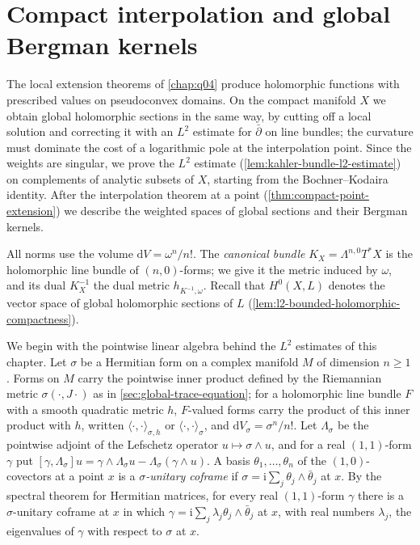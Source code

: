 \section{Compact interpolation and global Bergman kernels}
\label{sec:compact-point-bergman}
The local extension theorems of \cref{chap:q04} produce holomorphic functions with prescribed values on pseudoconvex domains. On the compact manifold $X$ we obtain global holomorphic sections in the same way, by cutting off a local solution and correcting it with an $L^2$ estimate for $\bar\partial$ on line bundles; the curvature must dominate the cost of a logarithmic pole at the interpolation point. Since the weights are singular, we prove the $L^2$ estimate (\cref{lem:kahler-bundle-l2-estimate}) on complements of analytic subsets of $X$, starting from the Bochner--Kodaira identity. After the interpolation theorem at a point (\cref{thm:compact-point-extension}) we describe the weighted spaces of global sections and their Bergman kernels.

All norms use the volume $\mathrm dV=\omega^n/n!$. The \emph{canonical bundle} $K_X=\Lambda^{n,0}T^*X$ is the holomorphic line bundle of $(n,0)$-forms; we give it the metric induced by $\omega$, and its dual $K_X^{-1}$ the dual metric $h_{K^{-1},\omega}$. Recall that $H^0(X,L)$ denotes the vector space of global holomorphic sections of $L$ (\cref{lem:l2-bounded-holomorphic-compactness}).

We begin with the pointwise linear algebra behind the $L^2$ estimates of this chapter. Let $\sigma$ be a Hermitian form on a complex manifold $M$ of dimension $n\geq1$. Forms on $M$ carry the pointwise inner product defined by the Riemannian metric $\sigma(\cdot,J\cdot)$ as in \cref{sec:global-trace-equation}; for a holomorphic line bundle $F$ with a smooth quadratic metric $h$, $F$-valued forms carry the product of this inner product with $h$, written $\langle\cdot,\cdot\rangle_{\sigma,h}$ or $\langle\cdot,\cdot\rangle_\sigma$, and $\mathrm dV_\sigma=\sigma^n/n!$. Let $\Lambda_\sigma$ be the pointwise adjoint of the Lefschetz operator $u\mapsto\sigma\wedge u$, and for a real $(1,1)$-form $\gamma$ put $[\gamma,\Lambda_\sigma]u=\gamma\wedge\Lambda_\sigma u-\Lambda_\sigma(\gamma\wedge u)$. A basis $\theta_1,\ldots,\theta_n$ of the $(1,0)$-covectors at a point $x$ is a \emph{$\sigma$-unitary coframe} if $\sigma=\mathrm i\sum_j\theta_j\wedge\bar\theta_j$ at $x$. By the spectral theorem for Hermitian matrices, for every real $(1,1)$-form $\gamma$ there is a $\sigma$-unitary coframe at $x$ in which $\gamma=\mathrm i\sum_j\lambda_j\theta_j\wedge\bar\theta_j$ at $x$, with real numbers $\lambda_j$, the eigenvalues of $\gamma$ with respect to $\sigma$ at $x$.


